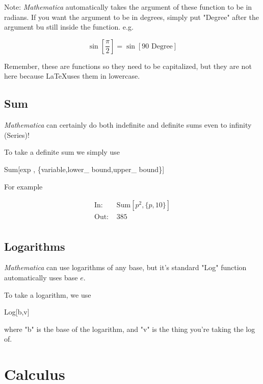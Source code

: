 \documentclass[11pt,a4paper,twoside]{article}
\begin{document}
				Note: \textit{Mathematica} automatically takes the argument of these function to be in radians.  If you want the argument to be in degrees, simply put "Degree" after the argument bu still inside the function.  e.g. 
						
				\[ \sin\left[ \frac{ \pi }{2} \right] = \sin[ 90 \text{ Degree} ] \]
						
				Remember, these are functions so they need to be capitalized, but they are not here because \LaTeX uses them in lowercase.
						
			\subsection{Sum}
						
				\textit{Mathematica} can certainly do both indefinite and definite sums even to infinity (Series)!
						
				To take a definite sum we simply use 

				\begin{center} Sum[exp , \{variable,lower\_ bound,upper\_ bound\}] \end{center}
						
					For example
						
					\begin{align*}
						\text{In: }& \text{Sum} [ p^2 , \{ p,10 \} ] \\
						\text{Out: }& 385 \\
					\end{align*}
					
			\subsection{Logarithms}
					
				\textit{Mathematica} can use logarithms of any base, but it's standard "Log" function automatically uses base $e$.
					
				To take a logarithm, we use
					
				\begin{center}
					
					Log[b,v]
					
				\end{center}
					
				where "b" is the base of the logarithm, and "v" is the thing you're taking the log of.
				
		\section{Calculus}
			
\end{document}
